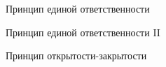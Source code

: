 \documentclass[10pt,pdf,hyperref={unicode}]{beamer}%
\begin{document}
\begin{frame}{Принцип единой ответственности}
\begin{figure}[h]
\end{figure}
\end{frame}

\begin{frame}{Принцип единой ответственности II}
\begin{figure}[h]
\end{figure}
\end{frame}


\begin{frame}{Принцип открытости-закрытости}
\begin{figure}[h]
\end{figure}
\end{frame}
\end{document}
